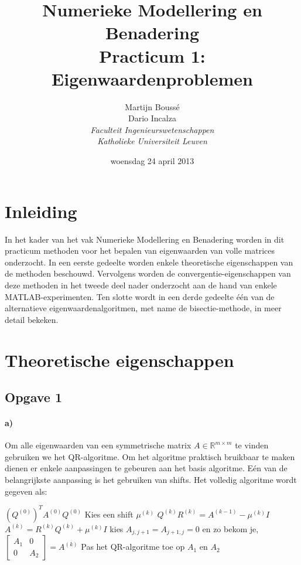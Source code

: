 \documentclass[a4paper, 12pt, titlepage]{report}
\author{Martijn Bouss\'e\\
	{Dario Incalza}\\
	{\em Faculteit Ingenieurswetenschappen}\\
	{\em Katholieke Universiteit Leuven}
}
\title{Numerieke Modellering en Benadering\\
	{Practicum 1: Eigenwaardenproblemen}
}
\date{woensdag 24 april 2013}
\begin{document}
\maketitle

\tableofcontents

\listoffigures

\pagebreak

\section{Inleiding}
In het kader van het vak Numerieke Modellering en Benadering worden in dit practicum methoden voor het bepalen van eigenwaarden van volle matrices onderzocht. In een eerste gedeelte worden enkele theoretische eigenschappen van de methoden beschouwd. Vervolgens worden de convergentie-eigenschappen van deze methoden in het tweede deel nader onderzocht aan de hand van enkele MATLAB-experimenten. Ten slotte wordt in een derde gedeelte \'e\'en van de alternatieve eigenwaardenalgoritmen, met name de bisectie-methode, in meer detail bekeken.

\section{Theoretische eigenschappen}

\subsection{Opgave 1}
\paragraph{a)} Om alle eigenwaarden van een symmetrische matrix $A \in \mathbb{R}^{m\times m}$ te vinden gebruiken we het QR-algoritme. Om het algoritme praktisch bruikbaar te maken dienen er enkele aanpassingen te gebeuren aan het basis algoritme. E\'en van de belangrijkste aanpassing is het gebruiken van shifts. Het volledig algoritme wordt gegeven als:\\

\begin{algorithmic}[frame=single]
 \STATE $(Q^{(0)})^TA^{(0)}Q^{(0)}$
 	\STATE Kies een shift $\mu^{(k)}$
 	\STATE $Q^{(k)}R^{(k)} = A^{(k-1)}-\mu^{(k)}I$
 	\STATE $A^{(k)} = R^{(k)}Q^{(k)}+\mu^{(k)}I$
 		\STATE kies $A_{j,j+1} = A_{j+1,j} = 0 $ en zo bekom je,
 		\STATE $\begin{bmatrix} A_1 & 0 \\ 0 & A_2 \end{bmatrix} = A^{(k)}$
 		\STATE Pas het QR-algoritme toe op $A_1$ en $A_2$
 	\ENDIF
 \ENDFOR
\end{algorithmic}
\end{document}
